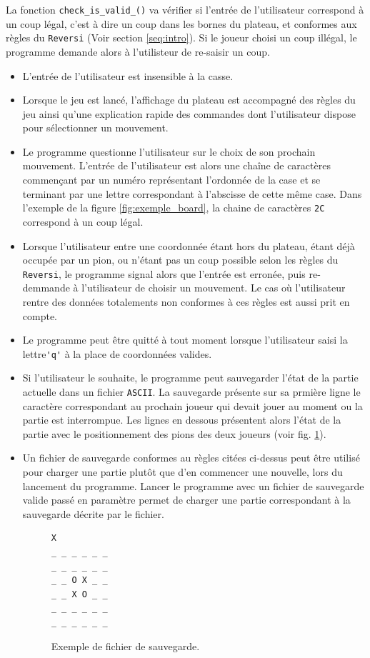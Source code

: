 \documentclass[10pt,a4paper]{article}
\begin{document}
La fonction \verb!check_is_valid_()! va vérifier si l'entrée de l'utilisateur correspond à un coup légal, c'est à dire un coup dans les bornes du plateau, et conformes aux règles du \verb!Reversi! (Voir section \ref{seq:intro}). Si le joueur choisi un coup illégal, le programme demande alors à l'utilisteur de re-saisir un coup.\\

\begin{itemize}
\item L'entrée de l'utilisateur est insensible à la casse.
\item Lorsque le jeu est lancé, l'affichage du plateau est accompagné des règles du jeu ainsi qu'une explication rapide des commandes dont l'utilisateur dispose pour sélectionner un mouvement.
\item Le programme questionne l'utilisateur sur le choix de son prochain mouvement. L'entrée de l'utilisateur est alors une chaîne de caractères commençant par un numéro représentant l'ordonnée de la case et se terminant par une lettre correspondant à l'abscisse de cette même case. Dans l'exemple de la figure \ref{fig:exemple_board}, la chaine de caractères \verb!2C! correspond à un coup légal.
\item Lorsque l'utilisateur entre une coordonnée étant hors du plateau, étant déjà occupée par un pion, ou n'étant pas un coup possible selon les règles du \verb!Reversi!, le programme signal alors que l'entrée est erronée, puis re-demmande à l'utilisateur de choisir un mouvement. Le cas où l'utilisateur rentre des données totalements non conformes à ces règles est aussi prit en compte.
\item Le programme peut être quitté à tout moment lorsque l'utilisateur saisi la lettre\verb!'q'! à la place de coordonnées valides.
\item Si l'utilisateur le souhaite, le programme peut sauvegarder l'état de la partie actuelle dans un fichier \verb!ASCII!. La sauvegarde présente sur sa prmière ligne le caractère correspondant au prochain joueur qui devait jouer au moment ou la partie est interrompue. Les lignes en dessous présentent alors l'état de la partie avec le positionnement des pions des deux joueurs (voir fig. \ref{fig:exemple_save}).
\item Un fichier de sauvegarde conformes au règles citées ci-dessus peut être utilisé pour charger une partie plutôt que d'en commencer une nouvelle, lors du lancement du programme.  Lancer le programme avec un fichier de sauvegarde valide passé en paramètre permet de charger une partie correspondant à la sauvegarde décrite par le fichier.
\begin{figure}[H]    
\centering
\begin{BVerbatim}
X
_ _ _ _ _ _
_ _ _ _ _ _
_ _ O X _ _
_ _ X O _ _
_ _ _ _ _ _
_ _ _ _ _ _ 
\end{BVerbatim}
\caption {Exemple de fichier de sauvegarde.\label{fig:exemple_save}}
\end{figure}


\end{itemize}
\end{document}
